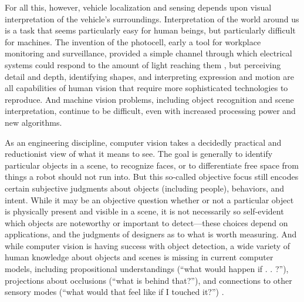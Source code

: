 For all this, however, vehicle localization and sensing depends upon
visual interpretation of the vehicle's surroundings. Interpretation of
the world around us is a task that seems
particularly easy for human beings, but particularly difficult for
machines. The invention of the photocell, early a tool for workplace
monitoring and surveillance, provided a simple channel through which
electrical systems could respond to the amount of light reaching
them \cite[p. 44]{faxed} \cite[p. 361]{nyeElectrifying}, but perceiving detail and
depth, identifying shapes, and interpreting expression and motion are
all capabilities of human vision that require more sophisticated
technologies to reproduce. And machine
vision problems, including object recognition and scene
interpretation, continue to be difficult, even with increased
processing power and new algorithms.

As an engineering discipline, computer vision takes a decidedly
practical and reductionist view of what it means to see. The goal is
generally to identify particular objects in a scene, to recognize
faces, or to differentiate free space from things a robot should
not run into. But this so-called objective focus still encodes
certain subjective judgments about objects (including people),
behaviors, and intent. While it may be an objective question whether or not a
particular object is physically present and visible in
a scene, it is not
necessarily so self-evident which objects are noteworthy or important
to detect---these choices depend on applications, and the judgments of
designers as to what is worth measuring. And while computer vision is having success
with object detection, a wide variety of human knowledge
about objects and scenes is missing in current computer
models, including propositional understandings (``what would happen if
. . ?''), projections about occlusions (``what is behind that?''), and
connections to other sensory modes (``what would that feel like if I
touched it?'') \cite{gomesJordan}.



